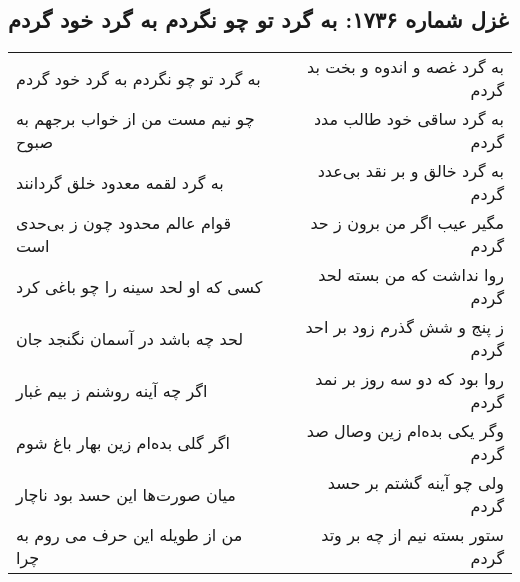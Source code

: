 \begin{center}
\section*{غزل شماره ۱۷۳۶: به گرد تو چو نگردم به گرد خود گردم}
\label{sec:1736}
\begin{longtable}{l p{0.5cm} r}
به گرد تو چو نگردم به گرد خود گردم
&&
به گرد غصه و اندوه و بخت بد گردم
\\
چو نیم مست من از خواب برجهم به صبوح
&&
به گرد ساقی خود طالب مدد گردم
\\
به گرد لقمه معدود خلق گردانند
&&
به گرد خالق و بر نقد بی‌عدد گردم
\\
قوام عالم محدود چون ز بی‌حدی است
&&
مگیر عیب اگر من برون ز حد گردم
\\
کسی که او لحد سینه را چو باغی کرد
&&
روا نداشت که من بسته لحد گردم
\\
لحد چه باشد در آسمان نگنجد جان
&&
ز پنج و شش گذرم زود بر احد گردم
\\
اگر چه آینه روشنم ز بیم غبار
&&
روا بود که دو سه روز بر نمد گردم
\\
اگر گلی بده‌ام زین بهار باغ شوم
&&
وگر یکی بده‌ام زین وصال صد گردم
\\
میان صورت‌ها این حسد بود ناچار
&&
ولی چو آینه گشتم بر حسد گردم
\\
من از طویله این حرف می روم به چرا
&&
ستور بسته نیم از چه بر وتد گردم
\\
\end{longtable}
\end{center}
